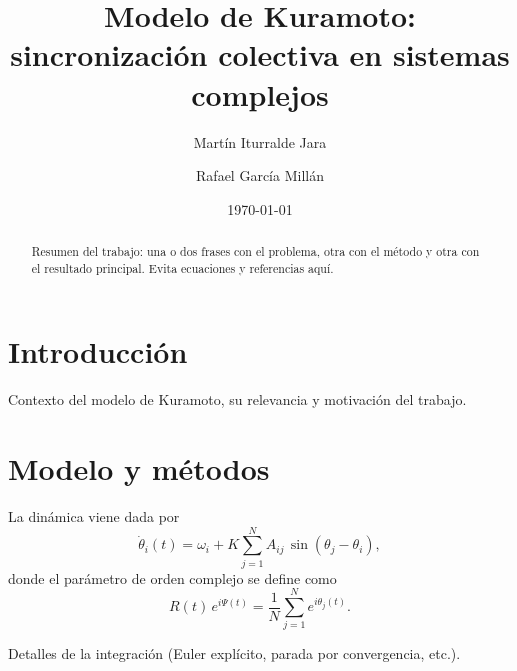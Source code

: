 \documentclass[
  reprint,
  amsmath,amssymb,
  aps,
  pra,            %
]{revtex4-2}
\begin{document}
\title{Modelo de Kuramoto: sincronizaci\'on colectiva en sistemas complejos}

\author{Martín Iturralde Jara}
\author{Rafael García Millán}

\date{\today}

\begin{abstract}
Resumen del trabajo: una o dos frases con el problema, otra con el m\'etodo
y otra con el resultado principal. Evita ecuaciones y referencias aqu\'i.
\end{abstract}

\maketitle


\section{Introducci\'on}
\label{sec:intro}

Contexto del modelo de Kuramoto, su relevancia y motivaci\'on del trabajo.


\section{Modelo y m\'etodos}
\label{sec:metodos}

La dinámica viene dada por
\begin{equation}
  \dot{\theta}_i(t) = \omega_i + K \sum_{j=1}^{N} A_{ij}\,\sin(\theta_j - \theta_i),
  \label{eq:kuramoto}
\end{equation}
donde el parámetro de orden complejo se define como
\begin{equation}
  R(t)\,e^{i\Psi(t)} = \frac{1}{N}\sum_{j=1}^{N} e^{i\theta_j(t)}.
  \label{eq:R}
\end{equation}

Detalles de la integración (Euler explícito, parada por convergencia, etc.).
\end{document}
